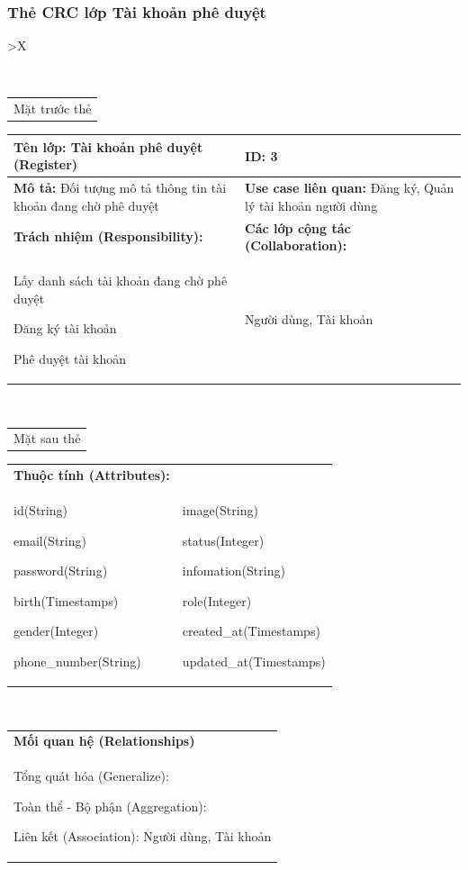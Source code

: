 \subsubsection{Thẻ CRC lớp Tài khoản phê duyệt}
  \begin{xltabular}{\textwidth}{
    >{\centering\arraybackslash}X 
  }
  \newpage
  \caption{\bfseries \fontsize{12pt}{0pt}\selectfont Thẻ CRC lớp Tài khoản phê duyệt}
  \\
  \begin{tabularx}{0.9\textwidth}{X}
    Mặt trước thẻ
  \end{tabularx}
  \begin{tabularx}{0.9\textwidth}{|X|X|}
    \hline
    \textbf{Tên lớp:} Tài khoản phê duyệt (Register) & \textbf{ID:} 3 \\
    \hline
    \textbf{Mô tả:} Đối tượng mô tả thông tin tài khoản đang chờ phê duyệt & \textbf{Use case liên quan:} Đăng ký, Quản lý tài khoản người dùng \\
    \hline
    \textbf{Trách nhiệm (Responsibility):} & \textbf{Các lớp cộng tác (Collaboration):} \\
    Lấy danh sách tài khoản đang chờ phê duyệt
    
    Đăng ký tài khoản

    Phê duyệt tài khoản
    & 
    Người dùng, Tài khoản
    \\
    \hline
  \end{tabularx}
  \\ 
  \begin{tabularx}{0.9\textwidth}{X}
    Mặt sau thẻ
  \end{tabularx}
  \begin{tabularx}{0.9\textwidth}{|X|X|}
    \hline
    \textbf{Thuộc tính (Attributes):} & \\
    id(String) 
    
    email(String)

    password(String)

    birth(Timestamps)

    gender(Integer)

    phone\_number(String)
    &
    image(String)

    status(Integer)

    infomation(String)

    role(Integer)

    created\_at(Timestamps)

    updated\_at(Timestamps)
    \\
    \hline
  \end{tabularx}
  \\     
  \begin{tabularx}{0.9\textwidth}{|X|}
    \textbf{Mối quan hệ (Relationships)} \\
    Tổng quát hóa (Generalize):  

    Toàn thể - Bộ phận (Aggregation):   
      
    Liên kết (Association): Người dùng, Tài khoản
    \\
    \hline
  \end{tabularx}
  \end{xltabular}

